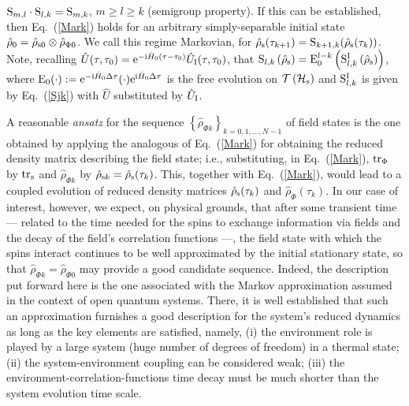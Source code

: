 \documentclass[]{nature}
\begin{document}
{${\rm S}_{m,l} \cdot{\rm S}_{l,k}= {\rm S}_{m,k}$, $m\geq l \geq k$ (semigroup property). If this can be established, then Eq.~(\ref{Mark}) 
holds for an arbitrary simply-separable initial state
$\hat\rho_0 = \hat\rho_{\rm s0}\otimes \hat \rho_{\Phi 0}$. We call this regime  Markovian, for $\hat\rho_{\rm s}(\tau_{k+1}) = {\rm S}_{k+1,k}(\hat\rho_{\rm s}(\tau_k))$.
Note, recalling   $\hat U(\tau,\tau_0) = {\rm e}^{-{\rm i}\hat H_0 (\tau-\tau_0)} \hat U_{\rm I}(\tau,\tau_0)$,  that ${\rm S}_{l,k}\left(\hat\rho_{\rm s}\right) = {\rm E}_{0}^{l-k}\left({\rm S}^{\rm I}_{l,k}\left(\hat\rho_{\rm s}\right)\right)$,
where
${\rm E}_0(\cdot):={\rm e}^{-{\rm i}\hat H_0\Delta\tau} (\cdot) {\rm e}^{{\rm i}\hat H_0\Delta\tau }$ is the free evolution on ${\cal T}\left({\cal H}_{\rm s}\right)$ and
${\rm S}^{\rm I}_{l,k}$ is given by Eq.~(\ref{Sjk}) with $\hat U$ substituted by $\hat U_{\rm I}$. 


A reasonable {\it ansatz}  for the sequence $\left\{\hat \rho_{\Phi k}\right\}_{k=0,1,\dots,N-1}$ of field states is the one obtained by
applying the analogous of Eq.~(\ref{Mark}) for obtaining the reduced density matrix describing the field state; i.e., substituting, in Eq.~(\ref{Mark}),
${\rm tr}_\Phi$ by ${\rm tr}_{\rm s}$ and $\hat \rho_{\Phi k}$ by $\hat \rho_{{\rm s}k}=\hat \rho_{\rm s}(\tau_k)$. This, together with Eq.~(\ref{Mark}), 
would lead to a coupled evolution of reduced density matrices $\hat \rho_{\rm s}(\tau_k)$ and $\hat \rho_{\Phi}(\tau_k)$. In our case of interest, however,
we expect, on physical grounds, that after some transient time --- related to the time needed for the spins to exchange information via fields and the decay of the field's correlation functions  ---, the field state with which the spins interact continues to be well approximated by the initial stationary state, so that
$\hat \rho_{\Phi k} = \hat \rho_{\Phi 0}$ may provide a good candidate sequence. Indeed, the description put forward here is the one associated with the Markov approximation assumed in the context of open quantum 
systems\cite{weiss, breuer}. There, it is well established that such an approximation furnishes a good description for the system's reduced dynamics as long as the key elements are satisfied, namely, (i) the environment role is played by a large system (huge number of degrees of freedom) in a thermal state; (ii) the system-environment coupling can be considered weak; (iii)  the environment-correlation-functions time decay must be much shorter than the system evolution time scale. 

}
\end{document}
